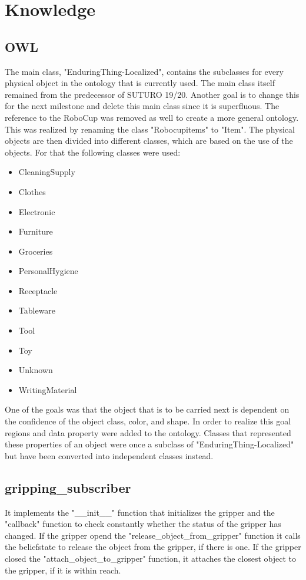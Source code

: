 \documentclass[main.tex]{subfiles}
\begin{document}
	
	\chapter{Knowledge}
		
		\section{OWL}
		The main class, "EnduringThing-Localized", contains the subclasses for every physical object in the ontology that is currently used. The main class itself remained from the predecessor of SUTURO 19/20. Another goal is to change this for the next milestone and delete this main class since it is superfluous.
The reference to the RoboCup was removed as well to create a more general ontology. This was realized by renaming the class "Robocupitems" to "Item". The physical objects are then divided into different classes, which are based on the use of the objects. For that the following classes were used:
		
		\begin{itemize}
		\item CleaningSupply
		\item Clothes
		\item Electronic
		\item Furniture
		\item Groceries
		\item PersonalHygiene
		\item Receptacle
		\item Tableware
		\item Tool
		\item Toy
		\item Unknown
		\item WritingMaterial
		\end{itemize}
		
		One of the goals was that the object that is to be carried next is dependent on the confidence of the object class, color, and shape. In order to realize this goal regions and data property were added to the ontology. Classes that represented these properties of an object were once a subclass of "EnduringThing-Localized" but have been converted into independent classes instead.  


		\section{gripping\_subscriber}
		It implements the "\_\_init\_\_" function that initializes the gripper and the "callback" function to check constantly whether the status of the gripper has changed. If the gripper opend the "release\_object\_from\_gripper" function it calls the beliefstate to release the object from the gripper, if there is one. If the gripper closed the "attach\_object\_to\_gripper" function, it attaches the closest object to the gripper, if it is within reach.
\end{document}
